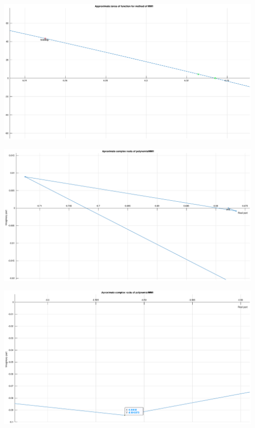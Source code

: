 \documentclass[12pt]{report}
\begin{document}
\begin{center}
   \includegraphics[scale=0.25]{task2mm1zommedright.eps}
\end{center}

\begin{center}
   \includegraphics[scale=0.25]{task2mm1complexzommedleft.eps}
\end{center}

\begin{center}
   \includegraphics[scale=0.25]{task2mm1complexzommeddown.eps}
\end{center}
\end{document}
